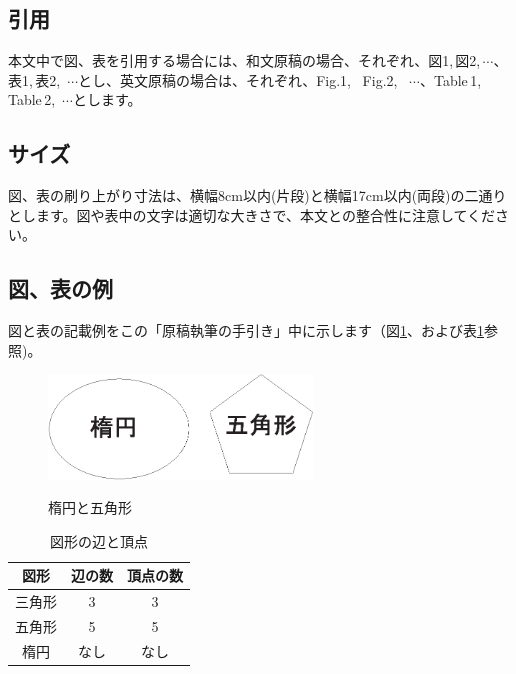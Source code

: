 \documentclass{hissymp}
\begin{document}
\subsection{引用}
本文中で図、表を引用する場合には、和文原稿の場合、それぞれ、図1,\,図2,\,$ \cdots $、表1,\,表2,\, $ \cdots $とし、英文原稿の場合は、それぞれ、Fig.1, \, Fig.2, \, $ \cdots $、Table\,1,\,Table\,2,\, $ \cdots $とします。

\subsection{サイズ}
図、表の刷り上がり寸法は、横幅8cm以内(片段)と横幅17cm以内(両段)の二通りとします。図や表中の文字は適切な大きさで、本文との整合性に注意してください。

\subsection{図、表の例}
図と表の記載例をこの「原稿執筆の手引き」中に示します（図\ref{fig:example1}、および表\ref{table:example2}参照)。

\begin{figure}[tb]
	\begin{center}
    \includegraphics[width=70mm]{fig1.eps}
	\caption{楕円と五角形}		%
	\label{fig:example1}
	\end{center}
\end{figure}

\begin{table}[t]
	\begin{center}
	\caption{図形の辺と頂点}		%
	\label{table:example2}
	\begin{tabular}[hbt]{c c c}
	\hline
	\bf 図形 & \bf 辺の数 & \bf 頂点の数\\
	\hline
	三角形 & 3 & 3\\
	五角形 & 5 & 5\\
	楕円 & なし & なし\\
	\hline
	\end{tabular}
	\end{center}
\end{table}
\end{document}
